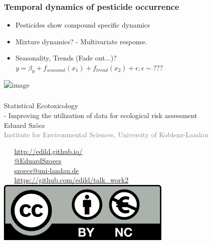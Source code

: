 \documentclass[12pt
, t
]{beamer}
\begin{document}
\begin{frame}
	\frametitle{Temporal dynamics of pesticide occurrence}
	\begin{itemize}
	\item Pesticides show compound specific dynamics
	\item Mixture dynamics? - Multivariate response. 
	\pause
	\item<2-> Seasonality, Trends (Fade out...)?  
	\pause
	$y = \beta_0 + f_{seasonal}(x_1) + f_{trend}(x_2) + \epsilon;  \epsilon \sim ???$
	\end{itemize}
	\begin{center}
	\includegraphics<2->[width =0.6\textwidth]{fig/gam1.png}
	\end{center}
\end{frame}




\begin{frame}[plain]
	\frametitle{}
	\vspace{1em}
	\begin{centering}
	\Large \textcolor{title}{Statistical Ecotoxicology \\ - Improving the utilization of data for ecological risk assessment} \\[1em]
	Eduard Szöcs \\[0.3em]
	\tiny \textcolor{gray}{Institute for Environmental Sciences, University of Koblenz-Landau} \\[3em]
	\end{centering}
	\normalsize
	\textcolor{hilight}{\faLaptop}~~~\href{http://edild.github.io/}{http://edild.github.io/ }\\[.5em]
	\textcolor{hilight}{\faTwitter}~~~\href{http://twitter.com/EduardSzoecs}{@EduardSzoecs} 	\\[0.5em]
	\textcolor{hilight}{\faEnvelope}~~~\href{mailto:szoecs@uni-landau.de}{szoecs@uni-landau.de} \\[.5em]
	\textcolor{hilight}{\faGift}~~~\href{https://github.com/edild/talk_work2}{https://github.com/edild/talk\_work2}\\[0.5em]
	\hfill \includegraphics[width =.3\textwidth]{fig/Cc-by-nc_euro_icon.png} 
\end{frame}
\end{document}
